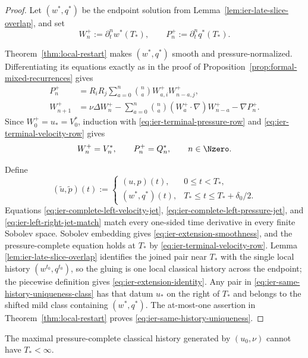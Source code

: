 \begin{proof}
Let \((w^*,q^*)\) be the endpoint solution from
Lemma~\ref{lem:ier-late-slice-overlap}, and set
\[
 W_n^+:=\partial_t^nw^*(T_*),
 \qquad
 P_n^+:=\partial_t^nq^*(T_*).
\]
\begin{samepage}
Theorem~\ref{thm:local-restart} makes \((w^*,q^*)\) smooth and
pressure-normalized.  Differentiating its equations exactly as in the proof of
Proposition~\ref{prop:formal-mixed-recurrences} gives
\begin{align*}
 P_n^+&=R_iR_j\sum_{a=0}^{n}\binom naW_{a,i}^+W_{n-a,j}^+,\\
 W_{n+1}^+&=\nu\Delta W_n^+
 -\sum_{a=0}^{n}\binom na(W_a^+\cdot\nabla)W_{n-a}^+
 -\nabla P_n^+.
\end{align*}
Since \(W_0^+=u_*=V_0^*\), induction with
\eqref{eq:ier-terminal-pressure-row} and
\eqref{eq:ier-terminal-velocity-row} gives
\begin{equation}
 W_n^+=V_n^*,
 \qquad P_n^+=Q_n^*,
 \qquad n\in\Nzero.
 \label{eq:ier-left-right-jet-match}
\end{equation}
\par
\end{samepage}

Define
\[
 (\widetilde u,\widetilde p)(t)
 :=\begin{cases}
 (u,p)(t),&0\le t<T_*,\\
 (w^*,q^*)(t),&T_*\le t\le T_*+\delta_0/2.
 \end{cases}
\]
Equations \eqref{eq:ier-complete-left-velocity-jet},
\eqref{eq:ier-complete-left-pressure-jet}, and
\eqref{eq:ier-left-right-jet-match} match every one-sided time derivative in
every finite Sobolev space.  Sobolev embedding gives
\eqref{eq:ier-extension-smoothness}, and the pressure-complete equation holds
at \(T_*\) by \eqref{eq:ier-terminal-velocity-row}.  Lemma
\ref{lem:ier-late-slice-overlap} identifies the joined pair near \(T_*\) with
the single local history \((w^{t_0},q^{t_0})\), so the gluing is one local
classical history across the endpoint; the piecewise definition gives
\eqref{eq:ier-extension-identity}.  Any pair in
\eqref{eq:ier-same-history-uniqueness-class} has that datum \(u_*\) on
the right of \(T_*\) and belongs to the shifted mild class containing
\((w^*,q^*)\).  The at-most-one assertion in
Theorem~\ref{thm:local-restart} proves
\eqref{eq:ier-same-history-uniqueness}.
\end{proof}

\begin{corollary}
\label{cor:ier-maximal-time-contradiction}
The maximal pressure-complete classical history generated by
\((u_0,\nu)\) cannot have \(T_*<\infty\).
\end{corollary}

